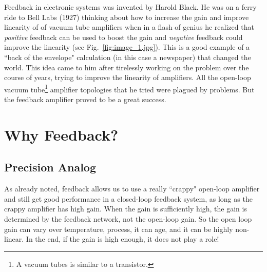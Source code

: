Feedback in electronic systems was invented by Harold Black.  He was on a ferry ride to Bell Labs (1927) thinking about how to increase the gain and improve linearity of of vacuum tube amplifiers when in a flash of genius he realized that \textit{positive} feedback can be used to boost the gain and \textit{negative} feedback could improve the linearity (see Fig.~\ref{fig:image_1.jpg}).  This is a good example of a ``back of the envelope" calculation (in this case a newspaper) that changed the world.  This idea came to him after tirelessly working on the problem over the course of years, trying to improve the linearity of amplifiers.  All the open-loop vacuum tube\footnote{A vacuum tubes is similar to a transistor.} amplifier topologies that he tried were plagued by problems.  But the feedback amplifier proved to be a great success.
\section{Why Feedback?}
\subsection{Precision Analog}
As already noted, feedback allows us to use a really ``crappy" open-loop amplifier and still get good performance in a closed-loop feedback system, as long as the crappy amplifier has high gain.  When the gain is sufficiently high, the gain is determined by the feedback network, not the open-loop gain.  So the open loop gain can vary over temperature, process, it can age, and it can be highly non-linear.  In the end, if the gain is high enough, it does not play a role!
